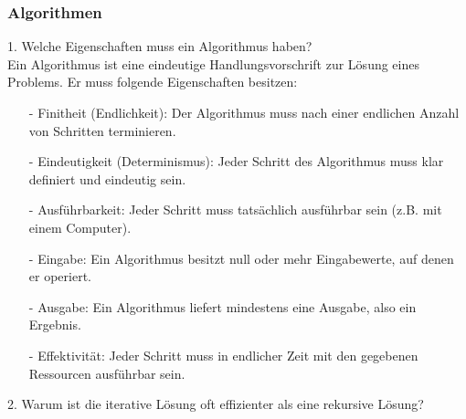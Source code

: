 \documentclass[a4paper,12pt]{article}
\begin{document}
	\subsubsection*{Algorithmen}
	
	1. Welche Eigenschaften muss ein Algorithmus haben?\\
	Ein Algorithmus ist eine eindeutige Handlungsvorschrift zur Lösung eines Problems. Er muss folgende Eigenschaften besitzen:
	\begin{enumerate}		
		\item[-] Finitheit (Endlichkeit): Der Algorithmus muss nach einer endlichen Anzahl von Schritten terminieren.
		\item[-] Eindeutigkeit (Determinismus): Jeder Schritt des Algorithmus muss klar definiert und eindeutig sein.
		\item[-] Ausführbarkeit: Jeder Schritt muss tatsächlich ausführbar sein (z.B. mit einem Computer).
		\item[-] Eingabe: Ein Algorithmus besitzt null oder mehr Eingabewerte, auf denen er operiert.
		\item[-] Ausgabe: Ein Algorithmus liefert mindestens eine Ausgabe, also ein Ergebnis.
		\item[-] Effektivität: Jeder Schritt muss in endlicher Zeit mit den gegebenen Ressourcen ausführbar sein.
	\end{enumerate}
	2. Warum ist die iterative Lösung oft effizienter als eine rekursive Lösung?\\
\end{document}
